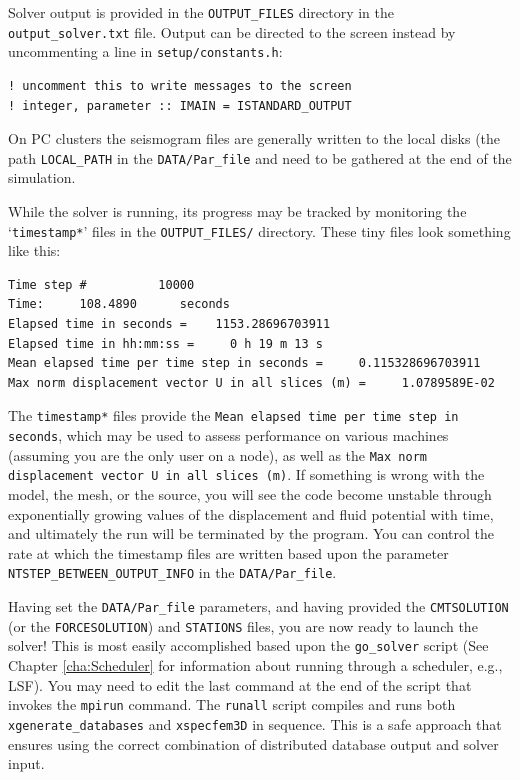 Solver output is provided in the \texttt{OUTPUT\_FILES} directory
in the \texttt{output\_solver.txt} file. Output can be directed to
the screen instead by uncommenting a line in \texttt{setup/constants.h}:
\begin{verbatim}
! uncomment this to write messages to the screen
! integer, parameter :: IMAIN = ISTANDARD_OUTPUT
\end{verbatim}
On PC clusters the seismogram files are generally written to the local
disks (the path \texttt{LOCAL\_PATH} in the \texttt{DATA/Par\_file} and
need to be gathered at the end of the simulation.\newline


While the solver is running, its progress may be tracked by monitoring
the `\texttt{\small timestamp{*}}' files in the \texttt{\small OUTPUT\_FILES/} directory. These tiny
files look something like this:
{\small
\begin{verbatim}
Time step #          10000
Time:     108.4890      seconds
Elapsed time in seconds =    1153.28696703911
Elapsed time in hh:mm:ss =     0 h 19 m 13 s
Mean elapsed time per time step in seconds =     0.115328696703911
Max norm displacement vector U in all slices (m) =     1.0789589E-02
\end{verbatim}
}
The \texttt{\small timestamp{*}} files provide the
\texttt{\small Mean elapsed time per time step in seconds}, which may be used
to assess performance on various machines (assuming you are the only
user on a node), as well as the
\texttt{\small Max norm displacement vector U in all slices~(m)}.
If something is wrong with the
model, the mesh, or the source, you will see the code become unstable
through exponentially growing values of the displacement and fluid
potential with time, and ultimately the run will be terminated by
the program. You can control the rate at which the timestamp files
are written based upon the parameter
\texttt{\small NTSTEP\_BETWEEN\_OUTPUT\_INFO}
in the \texttt{DATA/Par\_file}.\newline


Having set the \texttt{DATA/Par\_file} parameters, and having provided
the \texttt{CMTSOLUTION} (or the \texttt{FORCESOLUTION}) and \texttt{STATIONS}
files, you are now ready to launch the solver! This is most easily
accomplished based upon the \texttt{go\_solver} script (See Chapter
\ref{cha:Scheduler} for information about running through a scheduler,
e.g., LSF). You may need to edit the last command at the end of the
script that invokes the \texttt{mpirun} command. The \texttt{runall}
script compiles and runs both \texttt{xgenerate\_databases} and \texttt{xspecfem3D}
in sequence. This is a safe approach that ensures using the correct
combination of distributed database output and solver input.\newline


